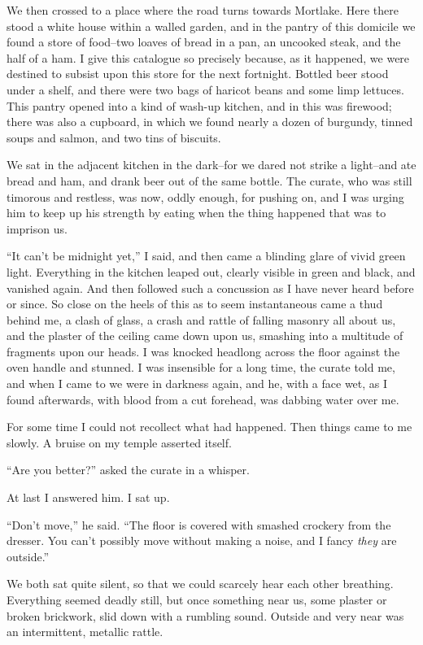 We then crossed to a place where the road turns towards Mortlake.
Here there stood a white house within a walled garden, and in the
pantry of this domicile we found a store of food--two loaves of
bread in a pan, an uncooked steak, and the half of a ham. I give
this catalogue so precisely because, as it happened, we were
destined to subsist upon this store for the next fortnight. Bottled
beer stood under a shelf, and there were two bags of haricot beans
and some limp lettuces. This pantry opened into a kind of wash-up
kitchen, and in this was firewood; there was also a cupboard, in
which we found nearly a dozen of burgundy, tinned soups and salmon,
and two tins of biscuits.

We sat in the adjacent kitchen in the dark--for we dared not strike
a light--and ate bread and ham, and drank beer out of the same
bottle. The curate, who was still timorous and restless, was now,
oddly enough, for pushing on, and I was urging him to keep up his
strength by eating when the thing happened that was to imprison
us.

``It can't be midnight yet,'' I said, and then came a blinding glare
of vivid green light. Everything in the kitchen leaped out, clearly
visible in green and black, and vanished again. And then followed
such a concussion as I have never heard before or since. So close
on the heels of this as to seem instantaneous came a thud behind
me, a clash of glass, a crash and rattle of falling masonry all
about us, and the plaster of the ceiling came down upon us,
smashing into a multitude of fragments upon our heads. I was
knocked headlong across the floor against the oven handle and
stunned. I was insensible for a long time, the curate told me, and
when I came to we were in darkness again, and he, with a face wet,
as I found afterwards, with blood from a cut forehead, was dabbing
water over me.

For some time I could not recollect what had happened. Then things
came to me slowly. A bruise on my temple asserted itself.

``Are you better?'' asked the curate in a whisper.

At last I answered him. I sat up.

``Don't move,'' he said. ``The floor is covered with smashed crockery
from the dresser. You can't possibly move without making a noise,
and I fancy \emph{they} are outside.''

We both sat quite silent, so that we could scarcely hear each other
breathing. Everything seemed deadly still, but once something near
us, some plaster or broken brickwork, slid down with a rumbling
sound. Outside and very near was an intermittent, metallic rattle.

